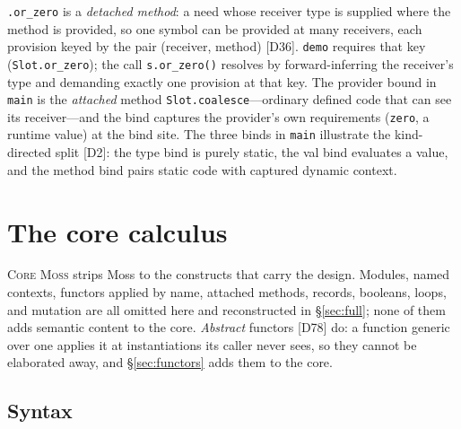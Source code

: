 \documentclass[10pt]{article}
\newcommand{\smallcode}[1]{\texttt{\small #1}}
\theoremstyle{plain}
\theoremstyle{remark}
\begin{document}
\smallcode{.or\_zero} is a \emph{detached method}: a need whose receiver
type is supplied where the method is provided, so one symbol can be
provided at many receivers, each provision keyed by the pair (receiver,
method) [D36]. \smallcode{demo} requires that key
(\smallcode{Slot.or\_zero}); the call \smallcode{s.or\_zero()} resolves by
forward-inferring the receiver's type and demanding exactly one provision
at that key. The provider bound in \smallcode{main} is the \emph{attached}
method \smallcode{Slot.coalesce}---ordinary defined code that can see its
receiver---and the bind captures the provider's own requirements
(\smallcode{zero}, a runtime value) at the bind site. The three binds in
\smallcode{main} illustrate the kind-directed split [D2]: the type bind is
purely static, the val bind evaluates a value, and the method bind pairs
static code with captured dynamic context.

\section{The core calculus}\label{sec:calculus}

\textsc{Core Moss} strips Moss to the constructs that carry the design.
Modules, named contexts, functors applied by name, attached methods,
records, booleans, loops, and mutation are all omitted here and
reconstructed in \S\ref{sec:full}; none of them adds semantic content to
the core. \emph{Abstract} functors [D78] do: a function generic over one
applies it at instantiations its caller never sees, so they cannot be
elaborated away, and \S\ref{sec:functors} adds them to the core.

\subsection{Syntax}
\end{document}

